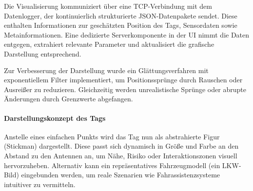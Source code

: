 \documentclass[a4paper, 12pt]{article} %
\begin{document}
Die Visualisierung kommuniziert über eine \ac{TCP}-Verbindung mit dem Datenlogger, der kontinuierlich strukturierte \ac{JSON}-Datenpakete sendet. Diese enthalten 
Informationen zur geschätzten Position des Tags, Sensordaten sowie Metainformationen. Eine dedizierte Serverkomponente in der \ac{UI} nimmt die Daten entgegen,
extrahiert relevante Parameter und aktualisiert die grafische Darstellung entsprechend.

Zur Verbesserung der Darstellung wurde ein Glättungsverfahren mit exponentiellem Filter implementiert, um Positionssprünge durch Rauschen oder Ausreißer 
zu reduzieren. Gleichzeitig werden unrealistische Sprünge oder abrupte Änderungen durch Grenzwerte abgefangen.

\paragraph{Darstellungskonzept des Tags}

Anstelle eines einfachen Punkts wird das Tag nun als abstrahierte Figur (Stickman) dargestellt. Diese passt sich dynamisch in Größe und Farbe an
den Abstand zu den Antennen an, um Nähe, Risiko oder Interaktionszonen visuell hervorzuheben. Alternativ kann ein repräsentatives Fahrzeugmodell 
(ein \ac{LKW}-Bild) eingebunden werden, um reale Szenarien wie Fahrassistenzsysteme intuitiver zu vermitteln.
\end{document}
